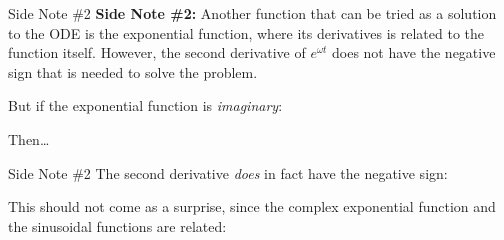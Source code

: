 \documentclass[12pt,compress,aspectratio=169]{beamer}
\begin{document}
\begin{frame}{Side Note \#2}
  \textbf{Side Note \#2:} Another function that can be tried as a solution to
  the ODE is the exponential function, where its derivatives is related to the
  function itself. However, the second derivative of $e^{\omega t}$ does not have
  the negative sign that is needed to solve the problem.


  But if the exponential function is \emph{imaginary}:


  \vspace{-.1in}Then\ldots
\end{frame}


\begin{frame}{Side Note \#2}
  The second derivative \emph{does} in fact have the negative sign:

  
  \vspace{-.55in}This should not come as a surprise, since the complex
  exponential function and the sinusoidal functions are related:

\end{frame}
\end{document}
